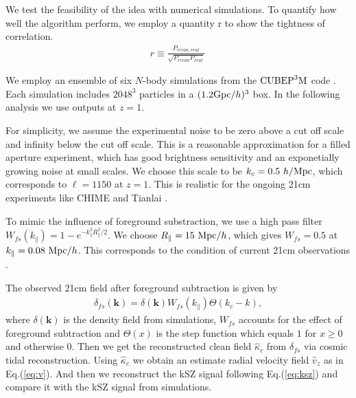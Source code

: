 We test the feasibility of the idea with numerical 
simulations. 
To quantify how well the algorithm perform, we employ a quantity r to show the tightness of correlation.
\begin{eqnarray}
	r\equiv \frac{P_{recon,real}}{\sqrt{P_{recon}P_{real}}}\,
\end{eqnarray}

We employ an ensemble of six $N$-body simulations from the
$\mathrm{CUBEP}^3\mathrm{M}$ code \cite{2013:code}. 
Each simulation includes $2048^3$ particles in a $(1.2\mathrm{Gpc}/h)^3$ box. 
In the following analysis we use outputs at $z=1$.

For simplicity, we assume the experimental
noise to be zero above a cut off scale and infinity below the cut off scale.
This is a reasonable approximation for a filled aperture experiment, which
has good brightness sensitivity and an exponetially growing noise at small 
scales.
We choose this scale to be $k_c=0.5\ h/\mr{Mpc}$, which corresponds
to $\ell=1150$ at $z=1$. This is realistic for the ongoing 21cm experiments like
CHIME \cite{2014SPIE.9145E..22B}\cite{2014SPIE.9145E..4VN}
and Tianlai \cite{2012IJMPS..12..256C}\cite{2015ApJ...798...40X}.

To mimic the influence of foreground substraction, we use a high pass filter 
$W_{fs}(k_\parallel)=1-e^{-k_\parallel^2R_\parallel^2/2}$. We choose 
$R_\parallel=15\ \mathrm{Mpc}/h$, which gives
$W_{fs}=0.5$ at
$k_\parallel=0.08\ \mathrm{Mpc}/h$.
This corresponds to the condition of current 21cm observations  
\cite{2013ApJ...763L..20M}\cite{Switzer13}.

The observed 21cm field after foreground subtraction is given by 
\begin{eqnarray}
\delta_{fs}(\bm{k})=\delta(\bm{k})W_{fs}(k_\parallel)\Theta(k_c-k),
\end{eqnarray}
where $\delta(\bm{k})$ is the density field from simulations, $W_{fs}$ accounts for 
the effect of foreground subtraction and $\Theta(x)$ is the step function 
which equals $1$ for $x\ge0$ and otherwise $0$.
Then we get the reconstructed clean field $\hat \kappa_c$ from $\delta_{fs}$ via
cosmic tidal reconstruction. 
Using $\hat \kappa_c$ we obtain an estimate radial velocity field $\hat v_z$ as in Eq.(\ref{eq:v}).
And then we reconstruct the kSZ signal following Eq.(\ref{eq:ksz}) and compare it with the kSZ signal from simulations.

